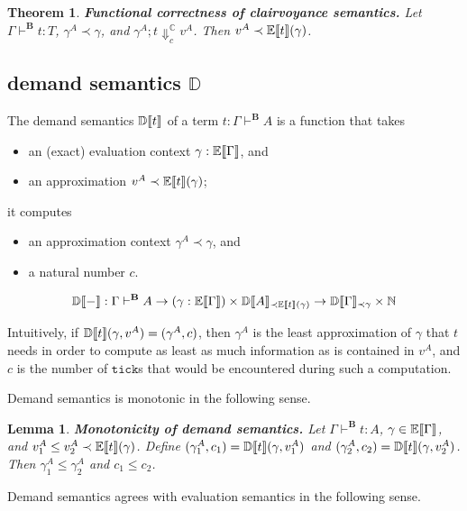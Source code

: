 \documentclass[11pt]{article}
\newcommand{\N}{\mathbb{N}}
\DeclarePairedDelimiter{\bbrackets}{\llbracket}{\rrbracket}
\newtheorem{lemma}{Lemma}
\newtheorem{theorem}{Theorem}
\newcommand{\LB}{\mathbf{B}}
\newcommand{\BE}{\mathbb{E}}
\newcommand{\Eval}[1]{\BE\bbrackets{#1}}
\newcommand{\BD}{\mathbb{D}}
\newcommand{\Demand}[1]{\BD\bbrackets{#1}}
\newcommand{\BC}{\mathbb{C}}
\newcommand{\CV}[4]{{{#1} \mathbin{;} {#2}} \Downarrow^\BC_{#3} {#4}}
\begin{document}
\begin{theorem}
\textbf{Functional correctness of clairvoyance semantics.}  Let \(\Gamma \vdash^\LB t : T\), \(\gamma^A \prec \gamma\), and \(\CV{\gamma^A}{t}{c}{v^A}\).  Then \(v^A \prec \Eval{t}(\gamma)\).
\end{theorem}
\subsection{demand semantics \(\BD\)}
\label{sec:orgbb5f782}

The demand semantics \(\Demand{t}\) of a term \(t : \Gamma \vdash^\LB A\) is a function that takes

\begin{itemize}
\item an (exact) evaluation context \(\gamma : \Eval{\Gamma}\), and
\item an approximation \(v^A \prec \Eval{t}(\gamma)\);
\end{itemize}

it computes

\begin{itemize}
\item an approximation context \(\gamma^A \prec \gamma\), and
\item a natural number \(c\).
\end{itemize}

\[
  \Demand{-} : \Gamma \vdash^\LB A \to (\gamma : \Eval{\Gamma}) \times \Demand{A}_{\prec \Eval{t}(\gamma)} \to \Demand{\Gamma}_{\prec \gamma} \times \N
\]

Intuitively, if \(\Demand{t}(\gamma, v^A) = (\gamma^A, c)\), then \(\gamma^A\) is the least approximation of \(\gamma\) that \(t\) needs in order to compute as least as much information as is contained in \(v^A\), and \(c\) is the number of \(\texttt{tick}\)s that would be encountered during such a computation.

Demand semantics is monotonic in the following sense.

\begin{lemma}
\textbf{Monotonicity of demand semantics.}  Let \(\Gamma \vdash^\LB t : A\), \(\gamma \in \Eval{\Gamma}\), and \(v^A_1 \le v^A_2 \prec \Eval{t}(\gamma)\).  Define \((\gamma^A_1, c_1) = \Demand{t}(\gamma, v^A_1)\) and \((\gamma^A_2, c_2) = \Demand{t}(\gamma, v^A_2)\).  Then \(\gamma^A_1 \le \gamma^A_2\) and \(c_1 \le c_2\).
\end{lemma}

Demand semantics agrees with evaluation semantics in the following sense.
\end{document}
